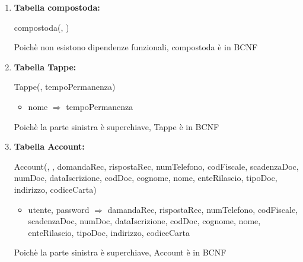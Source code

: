 \documentclass[12pt,a4paper]{article}
\begin{document}
\begin{enumerate}
\item[] \textbf{Tabella compostoda:}

compostoda(\underline{}, \underline{})

Poichè non esistono dipendenze funzionali, compostoda è in BCNF
\vspace{10pt}



\item[] \textbf{Tabella Tappe:}

Tappe(\underline{}, tempoPermanenza)
\begin{itemize}
\vspace{-5pt}
\item nome $\Rightarrow$ tempoPermanenza
\vspace{-5pt}
\end{itemize}
Poichè la parte sinistra è superchiave, Tappe è in BCNF
\vspace{10pt}
 


\item[] \textbf{Tabella Account:}

Account(\underline{}, \underline{}, domandaRec, rispostaRec, numTelefono, codFiscale, scadenzaDoc, numDoc, dataIscrizione, codDoc, cognome, nome, enteRilascio, tipoDoc, indirizzo, codiceCarta)
\begin{itemize}
\vspace{-5pt}
\item utente, password $\Rightarrow$ damandaRec, rispostaRec, numTelefono, codFiscale, scadenzaDoc, numDoc, dataIscrizione, codDoc, cognome, nome, enteRilascio, tipoDoc, indirizzo, codiceCarta
\vspace{-5pt}
\end{itemize}
Poichè la parte sinistra è superchiave, Account è in BCNF
\vspace{10pt}




\end{enumerate}
\end{document}
